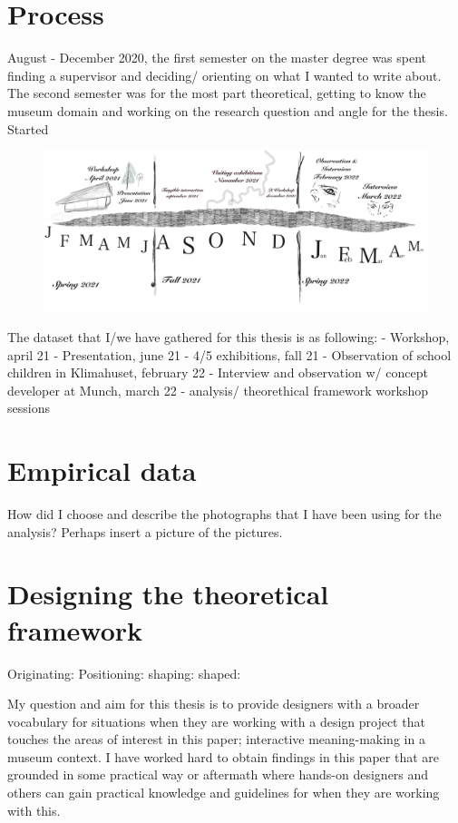 \section{Process }

August - December 2020, the first semester on the master degree was spent finding a supervisor and deciding/ orienting on what I wanted to write about. The second semester was for the most part theoretical, getting to know the museum domain and working on the research question and angle for the thesis. Started 

\begin{figure}[h]
\includegraphics[width=13cm]{pictures/timeline.jpg}
\centering 
\end{figure}

The dataset that I/we have gathered for this thesis is as following:
- Workshop, april 21
- Presentation, june 21
- 4/5 exhibitions, fall 21
- Observation of school children in Klimahuset, february 22
- Interview and observation w/ concept developer at Munch, march 22
- analysis/ theorethical framework workshop sessions

\section{Empirical data}

How did I choose and describe the photographs that I have been using for the analysis? Perhaps insert a picture of the pictures.




\section{Designing the theoretical framework}

Originating:
Positioning:
shaping:
shaped:

My question and aim for this thesis is to provide designers with a broader vocabulary for situations when they are working with a design project that touches the areas of interest in this paper; interactive meaning-making in a museum context. I have worked hard to obtain findings in this paper that are grounded in some practical way or aftermath where hands-on designers and others can gain practical knowledge and guidelines for when they are working with this. 


